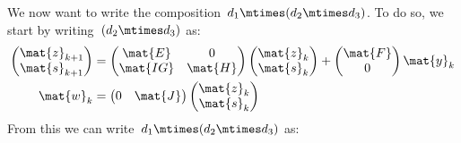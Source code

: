 We now want to write the composition~$d_1\mtimes (d_2\mtimes d_3)$.
To do so, we start by writing~$(d_2\mtimes d_3)$ as:
\begin{equation*}
    \label{eq:dlin-6}
    \begin{aligned}
        \begin{pmatrix}
            \mat{z}_{k+1} \\
            \mat{s}_{k+1}
        \end{pmatrix}&=
        \begin{pmatrix}
            \mat{E}  & 0       \\
            \mat{IG} & \mat{H}
        \end{pmatrix}\begin{pmatrix}
                         \mat{z}_k\\ \mat{s}_k
        \end{pmatrix}+
        \begin{pmatrix}
            \mat{F}\\ 0
        \end{pmatrix}\mat{y}_k\\
        \mat{w}_k&=\begin{pmatrix}
                       0& \mat{J}
        \end{pmatrix}\begin{pmatrix}
                         \mat{z}_k\\ \mat{s}_k
        \end{pmatrix}
    \end{aligned}
\end{equation*}
From this we can write~$d_1\mtimes (d_2\mtimes d_3)$ as:
